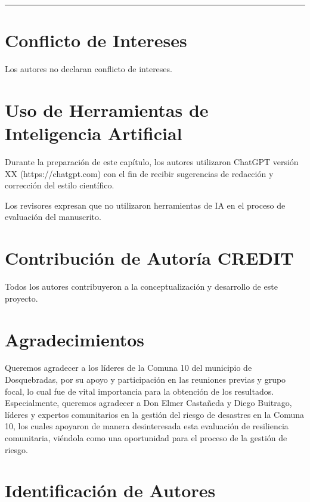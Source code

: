 \documentclass[
  letterpaper,
]{book}
\begin{document}
\begin{center}\rule{0.5\linewidth}{0.5pt}\end{center}

\section{Conflicto de Intereses}\label{conflicto-de-intereses}

Los autores no declaran conflicto de intereses.

\section{Uso de Herramientas de Inteligencia
Artificial}\label{uso-de-herramientas-de-inteligencia-artificial}

Durante la preparación de este capítulo, los autores utilizaron ChatGPT
versión XX (https://chatgpt.com) con el fin de recibir sugerencias de
redacción y corrección del estilo científico.

Los revisores expresan que no utilizaron herramientas de IA en el
proceso de evaluación del manuscrito.

\section{Contribución de Autoría
CREDIT}\label{contribuciuxf3n-de-autoruxeda-credit}

Todos los autores contribuyeron a la conceptualización y desarrollo de
este proyecto.

\section{Agradecimientos}\label{agradecimientos}

Queremos agradecer a los líderes de la Comuna 10 del municipio de
Dosquebradas, por su apoyo y participación en las reuniones previas y
grupo focal, lo cual fue de vital importancia para la obtención de los
resultados. Especialmente, queremos agradecer a Don Elmer Castañeda y
Diego Buitrago, líderes y expertos comunitarios en la gestión del riesgo
de desastres en la Comuna 10, los cuales apoyaron de manera
desinteresada esta evaluación de resiliencia comunitaria, viéndola como
una oportunidad para el proceso de la gestión de riesgo.

\section{Identificación de Autores}\label{identificaciuxf3n-de-autores}
\end{document}
